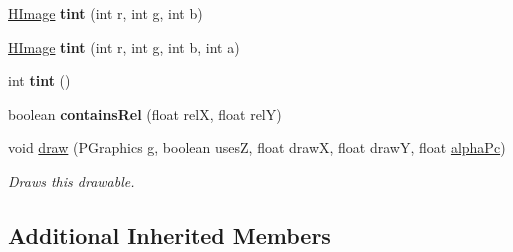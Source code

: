 \begin{DoxyCompactItemize}
\item 
\hypertarget{classhype_1_1extended_1_1drawable_1_1_h_image_ab1b3a95e2f9dbbdcbbd481b9767b664d}{\hyperlink{classhype_1_1extended_1_1drawable_1_1_h_image}{H\-Image} {\bfseries tint} (int r, int g, int b)}\label{classhype_1_1extended_1_1drawable_1_1_h_image_ab1b3a95e2f9dbbdcbbd481b9767b664d}

\item 
\hypertarget{classhype_1_1extended_1_1drawable_1_1_h_image_a0b49463cd10d4c9e1f5544da1ccf6935}{\hyperlink{classhype_1_1extended_1_1drawable_1_1_h_image}{H\-Image} {\bfseries tint} (int r, int g, int b, int a)}\label{classhype_1_1extended_1_1drawable_1_1_h_image_a0b49463cd10d4c9e1f5544da1ccf6935}

\item 
\hypertarget{classhype_1_1extended_1_1drawable_1_1_h_image_aa25ef076ab82dd60f51b136d73ab4e48}{int {\bfseries tint} ()}\label{classhype_1_1extended_1_1drawable_1_1_h_image_aa25ef076ab82dd60f51b136d73ab4e48}

\item 
\hypertarget{classhype_1_1extended_1_1drawable_1_1_h_image_a39fc89ba22e26b0f2cb05342f258fb0c}{boolean {\bfseries contains\-Rel} (float rel\-X, float rel\-Y)}\label{classhype_1_1extended_1_1drawable_1_1_h_image_a39fc89ba22e26b0f2cb05342f258fb0c}

\item 
void \hyperlink{classhype_1_1extended_1_1drawable_1_1_h_image_ad452f286e74b33cda66bafa09cb8cd7a}{draw} (P\-Graphics g, boolean uses\-Z, float draw\-X, float draw\-Y, float \hyperlink{classhype_1_1core_1_1drawable_1_1_h_drawable_ad4f0e4c9f93d810c66b39f1715625719}{alpha\-Pc})
\begin{DoxyCompactList}\small\item\em Draws this drawable. \end{DoxyCompactList}\end{DoxyCompactItemize}
\subsection*{Additional Inherited Members}


